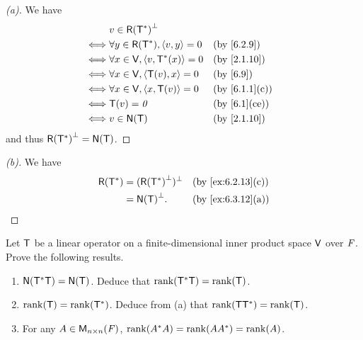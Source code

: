 \begin{proof}[(a)]
	We have
	\begin{align*}
		     & v \in \rg{\T^*}^{\perp}                                    \\
		\iff & \forall y \in \rg{\T^*}, \inn{v, y} = 0 &  & \by{6.2.9}    \\
		\iff & \forall x \in \V, \inn{v, \T^*(x)} = 0  &  & \by{2.1.10}   \\
		\iff & \forall x \in \V, \inn{\T(v), x} = 0    &  & \by{6.9}      \\
		\iff & \forall x \in \V, \inn{x, \T(v)} = 0    &  & \by{6.1.1}[c] \\
		\iff & \T(v) = \zv                             &  & \by{6.1}[ce]  \\
		\iff & v \in \ns{\T}                           &  & \by{2.1.10}
	\end{align*}
	and thus \(\rg{\T^*}^{\perp} = \ns{\T}\).
\end{proof}

\begin{proof}[(b)]
	We have
	\begin{align*}
		\rg{\T^*} & = (\rg{\T^*}^{\perp})^{\perp} &  & \by{ex:6.2.13}[c] \\
		          & = \ns{\T}^{\perp}.            &  & \by{ex:6.3.12}[a]
	\end{align*}
\end{proof}

\begin{ex}\label{ex:6.3.13}
	Let \(\mathsf{T}\) be a linear operator on a finite-dimensional inner product space \(\mathsf{V}\) over \(\mathit{F}\).
	Prove the following results.
	\begin{enumerate}
		\item \(\ns{\T^* \T} = \ns{\T}\).
		      Deduce that \(\rk{\T^* \T} = \rk{\T}\).
		\item \(\rk{\T} = \rk{\T^*}\).
		      Deduce from (a) that \(\rk{\T \T^*} = \rk{\T}\).
		\item For any \(A \in \mathsf{M}_{{n} \times n}({\mathit{F}})\), \(\rk{A^* A} = \rk{A A^*} = \rk{A}\).
	\end{enumerate}
\end{ex}

